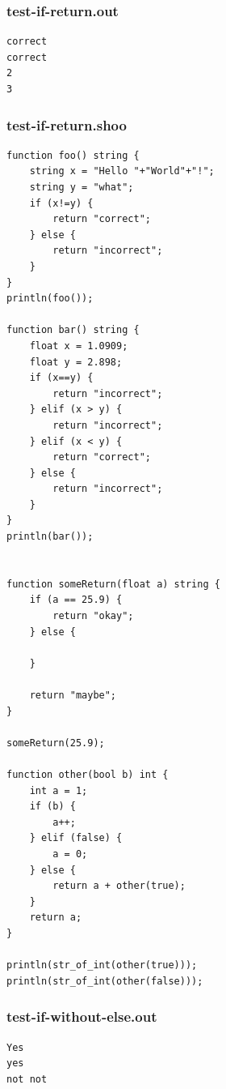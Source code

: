 \documentclass[12pt]{article}
\begin{document}
\subsubsection{test-if-return.out}
\begin{mdframed}[hidealllines=true,backgroundcolor=green!10]
\begin{lstlisting}
correct
correct
2
3
\end{lstlisting}
\end{mdframed}
\subsubsection{test-if-return.shoo}
\begin{mdframed}[hidealllines=true,backgroundcolor=blue!10]
\begin{lstlisting}
function foo() string {
    string x = "Hello "+"World"+"!";
    string y = "what";
    if (x!=y) {
        return "correct";
    } else {
        return "incorrect";
    }
}
println(foo());

function bar() string {
    float x = 1.0909;
    float y = 2.898;
    if (x==y) {
        return "incorrect";
    } elif (x > y) {
        return "incorrect";
    } elif (x < y) {
        return "correct";
    } else {
        return "incorrect";
    }
}
println(bar());


function someReturn(float a) string {
    if (a == 25.9) {
        return "okay";
    } else {
        
    }
    
    return "maybe";
}

someReturn(25.9);

function other(bool b) int {
    int a = 1;
    if (b) {
        a++;
    } elif (false) {
        a = 0;
    } else {
        return a + other(true);
    }
    return a;
}

println(str_of_int(other(true)));
println(str_of_int(other(false)));
\end{lstlisting}
\end{mdframed}

\subsubsection{test-if-without-else.out}
\begin{mdframed}[hidealllines=true,backgroundcolor=green!10]
\begin{lstlisting}
Yes
yes
not not
\end{lstlisting}
\end{mdframed}
\end{document}
